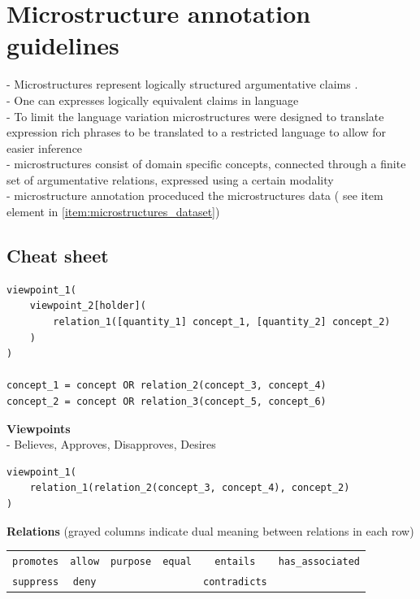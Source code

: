 \section{Microstructure annotation guidelines}
\label{sec:microstructure_annotation_appendix}

\noindent - Microstructures represent logically structured argumentative claims
\cite{boltuzic2017toward}. \\
- One can expresses logically equivalent claims in language \\
- To limit the language variation microstructures were designed to translate
expression rich phrases to be translated to a restricted language to allow for
easier inference \\
- microstructures  consist of domain specific concepts, 
connected through a finite set of argumentative relations, expressed using 
a certain modality \\
- microstructure annotation proceduced the microstructures data (
see item element in \ref{item:microstructures_dataset})\\

\newpage
\subsection{Cheat sheet}

\begin{verbatim}
viewpoint_1(
	viewpoint_2[holder](
		relation_1([quantity_1] concept_1, [quantity_2] concept_2)
	)
)

concept_1 = concept OR relation_2(concept_3, concept_4)
concept_2 = concept OR relation_3(concept_5, concept_6)

\end{verbatim}

\noindent \textbf{Viewpoints} \\
- Believes, Approves, Disapproves, Desires

\begin{verbatim}
viewpoint_1(
	relation_1(relation_2(concept_3, concept_4), concept_2)
)
\end{verbatim}

\noindent \textbf{Relations} (grayed columns indicate dual meaning between relations in each row)

\begin{table}[!htb]
\begin{tabular}{|c c c c c c|}
\hline
\cellcolor{gray!25} \texttt{promotes} & \cellcolor{gray!25}\texttt{allow} & \texttt{purpose} & \texttt{equal} & \cellcolor{gray!25}\texttt{entails}     & \texttt{has\_associated} \\
\cellcolor{gray!25} \texttt{suppress} & \cellcolor{gray!25}\texttt{deny}  &         &       & \cellcolor{gray!25}\texttt{contradicts} &  \\
\hline
\end{tabular}
\end{table}


